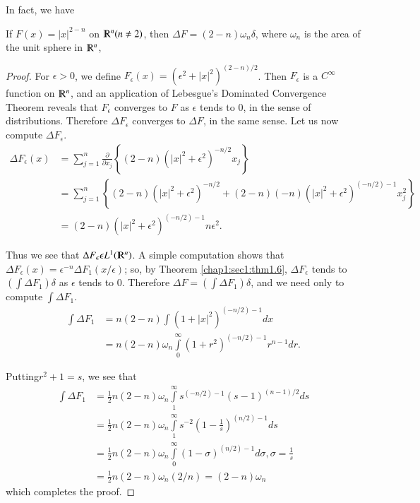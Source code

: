  In fact, we have
\setcounter{thm}{15}
\begin{thm} \label{chap2:sec4:thm2.16}%
  If $ F(x) = |x|^{2-n}$ on $ \varmathbb{R}^n (n \neq 2 )$, then $
  \Delta F = ( 2 -n ) \omega _n \delta $, where $\omega_n$ is the area
  of the unit sphere in $\varmathbb{R}^n$, 
\end{thm} 
\begin{proof}
  For $ \epsilon > 0$, we define $F_{\epsilon} (x) = ( \epsilon
  ^2 + |x|^2 ) ^{(2-n) /2}$. Then $F _{\epsilon} $ is a $C^{\infty}$
  function on $ \varmathbb{R}^n$, and an application of Lebesgue's
  Dominated Convergence Theorem reveals that $F_{\epsilon}$ converges
  to $F$ as $\epsilon$ tends to 0, in the sense of distributions. 
  Therefore $\Delta F _{\epsilon}$ converges to $\Delta
  F$, in the same sense. Let us now compute $\Delta F_{\epsilon}$.  
  \begin{align*}
    \Delta F_{\epsilon} (x) & = \sum_{j=1}^ n \frac{\partial}{\partial
      x_{j}} \left\{ (2 -n ) (|x|^2 + \epsilon ^2 ) ^{-n/2} x_j\right\}\\ 
    &= \sum_{j=1}^n \left\{ (2-n )(|x|^2 + \epsilon ^2 ) ^{-n/2}+(2-n)(-n)
    (|x|^2 + \epsilon ^2 ) ^{(-n/2)-1}x_j^2 \right\}\\ 
    &=(2-n) ( |x|^2 + \epsilon ^2) ^{ (-n/2)-1}n \epsilon ^2.
  \end{align*} 
  
  Thus we see that $\Delta F_\epsilon \epsilon L^1 (\varmathbb{R}^n)$. A
  simple computation shows that $\Delta F _\epsilon (x) =
  \epsilon ^{-n } \Delta F_1 (x / \epsilon)$; so, by Theorem
  \ref{chap1:sec1:thm1.6}, $\Delta F _\epsilon$ tends to $(
  \int\limits \Delta F_1) 
  \delta$ as $\epsilon$ tends to $0$. Therefore $\Delta F= (
  \int\limits \Delta F_1) \delta$, and we need only to compute
  $\int\limits \Delta F_1$.
 \begin{align*}
 \int \Delta F_1 & = n(2-n) \int(1 + |x|^2 ) ^{(-n/2) -1}dx\\
 &= n (2-n) \omega_n \int\limits_{0}^{\infty} (1+ r^2)^{(-n/2)-1}r^{n-1}dr.	
 \end{align*} 
  
 Putting\pageoriginale $r^2 +1 =s$, we see that 
 \begin{align*}
   \int \Delta F_1 &= \frac{1}{2} n ( 2-n) \omega_n
   \int\limits^{\infty}_1 s^{ (-n/2)-1} (s-1) ^{(n-1)/2}ds\\ 
   &=  \frac{1}{2} n (2-n) \omega_n \int\limits_{1}^{\infty} s^{-2}(1 -
   \frac{1}{s}) ^{(n/2)-1}ds\\ 
   &= \frac{1}{2}n (2 -n) \omega_n \int\limits_{0}^{\infty} ( 1 - \sigma)
   ^{(n/2)-1}d \sigma, \sigma= \frac{1}{s}\\
   &= \frac{1}{2}n (2-n)\omega_n (2/n) = (2-n) \omega_n
 \end{align*} 
 which completes the proof.
\end{proof}

